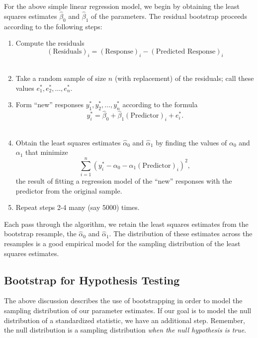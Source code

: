 \documentclass[
  letterpaper,
  DIV=11,
  numbers=noendperiod]{scrreprt}
\providecommand{\tightlist}{%
  \setlength{\itemsep}{0pt}\setlength{\parskip}{0pt}}\usepackage{longtable,booktabs,array}
\theoremstyle{plain}
\theoremstyle{definition}
\theoremstyle{definition}
\theoremstyle{remark}
\begin{document}
For the above simple linear regression model, we begin by obtaining the
least squares estimates \(\widehat{\beta}_0\) and \(\widehat{\beta}_1\)
of the parameters. The residual bootstrap proceeds according to the
following steps:

\begin{enumerate}
\def\labelenumi{\arabic{enumi}.}
\tightlist
\item
  Compute the residuals
  \[(\text{Residuals})_i = (\text{Response})_i - (\text{Predicted Response})_i\]\\
\item
  Take a random sample of size \(n\) (with replacement) of the
  residuals; call these values \(e_1^*, e_2^*, \dotsc, e_n^*\).\\
\item
  Form ``new'' responses \(y_1^*, y_2^*, \dotsc, y_n^*\) according to
  the formula
  \[y_i^* = \widehat{\beta}_0 + \widehat{\beta}_1 (\text{Predictor})_i + e_i^*.\]\\
\item
  Obtain the least squares estimates \(\widehat{\alpha}_0\) and
  \(\widehat{\alpha}_1\) by finding the values of \(\alpha_0\) and
  \(\alpha_1\) that minimize
  \[\sum_{i=1}^{n} \left(y_i^* - \alpha_0 - \alpha_1 (\text{Predictor})_i\right)^2,\]
  the result of fitting a regression model of the ``new'' responses with
  the predictor from the original sample.\\
\item
  Repeat steps 2-4 many (say 5000) times.
\end{enumerate}

Each pass through the algorithm, we retain the least squares estimates
from the bootstrap resample, the \(\widehat{\alpha}_0\) and
\(\widehat{\alpha}_1\). The distribution of these estimates across the
resamples is a good empirical model for the sampling distribution of the
least squares estimates.

\hypertarget{bootstrap-for-hypothesis-testing}{%
\subsection{Bootstrap for Hypothesis
Testing}\label{bootstrap-for-hypothesis-testing}}

The above discussion describes the use of bootstrapping in order to
model the sampling distribution of our parameter estimates. If our goal
is to model the null distribution of a standardized statistic, we have
an additional step. Remember, the null distribution is a sampling
distribution \emph{when the null hypothesis is true}.
\end{document}
